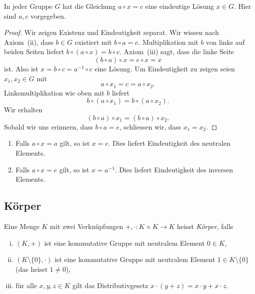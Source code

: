 \documentclass[../main.tex]{subfiles}
\begin{document}
\begin{manualproposition}{3}
  In jeder Gruppe $G$
  hat die Gleichung $a \circ x = c$
  eine eindeutige Lösung $x \in G$. Hier sind $a,c$ vorgegeben.
\end{manualproposition}

\begin{proof}
  Wir zeigen Existenz und Eindeutigkeit separat. Wir wissen nach
  Axiom~(ii), dass $b \in G$ existiert mit $b \circ a = e$.
  Multiplikation mit $b$ von links auf beiden Seiten liefert
  $b \circ (a \circ x) = b \circ c$. Axiom~(iii) sagt, dass
  die linke Seite
  \[
    (b \circ a) \circ x = e \circ x = x
  \]
  ist. Also ist $x = b \circ c = a^{-1} \circ c$ eine Lösung.
  Um Eindeutigkeit zu zeigen seien $x_{1}, x_{2} \in G$ mit
  \[
    a \circ x_{1} = c = a \circ x_{2}.
  \]
  Linksmultiplikation wie oben mit $b$ liefert
  \[b \circ (a \circ x_{1}) = b \circ (a \circ x_{2}).\]
  Wir erhalten
  \[
    (b \circ a) \circ x_{1} = (b \circ a) \circ x_{2}.
  \]
  Sobald wir uns erinnern, dass $b \circ a = e$, schliessen wir,
  dass $x_{1} = x_{2}$.
\end{proof}

\begin{specialcases}
  \leavevmode
  \begin{enumerate}[(1)]
    \item Falls $a \circ x = a$ gilt, so ist $x = e$. Dies liefert Eindeutigkeit
      des neutralen Elements.
    \item Falls $a \circ x = e$ gilt, so ist $x = a^{-1}$. Dies liefert
      Eindeutigkeit des inversen Elements.
  \end{enumerate}
\end{specialcases}

\subsection*{Körper}
\begin{definition}
  Eine Menge $K$ mit zwei Verknüpfungen $+, \cdot \colon K \times K \to K$ heisst
  \textit{Körper}, falls
  \begin{enumerate}[(i)]
    \item $(K, +)$ ist eine kommutative Gruppe mit neutralem
      Element $0 \in K$,
    \item $(K \setminus \{0\}, \cdot)$ ist eine kommutative Gruppe
      mit neutralem Element $1 \in K \setminus \{0\}$ (das heisst $1 \neq 0$),
    \item für alle $x,y,z \in K$ gilt das
      Distributivgesetz $x \cdot (y + z) = x \cdot y + x \cdot z$.
  \end{enumerate}
\end{definition}
\end{document}
